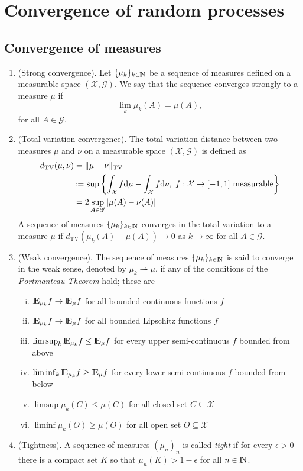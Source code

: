 \documentclass[a4paper,10pt]{scrbook}
\begin{document}
\section{Convergence of random processes}
\subsection{Convergence of measures}
\begin{enumerate}
 \item (Strong convergence). Let $\{\mu_k\}_{k\in\N}$ be a sequence of measures defined on a 
       measurable space $(\mathcal{X}, \mathscr{G})$. We say that the sequence converges strongly
       to a measure $\mu$ if
       \[
        \lim_k \mu_k(A) = \mu(A),
       \]
      for all $A\in\mathscr{G}$.
 \item (Total variation convergence). The total variation distance between two measures $\mu$ and 
       $\nu$ on a measurable space $(\mathcal{X}, \mathscr{G})$ is defined as
       \begin{align*}
        d_{\mathrm{TV}}(\mu,\nu) &= \|\mu-\nu\|_{\mathrm{TV}} \\
          &{}\mathop{\mathrel{:}=}{} \sup \left\{\int_{\mathcal{X}}f\mathrm{d}\mu - \int_{\mathcal{X}}f \mathrm{d} \nu,\ f:\mathcal{X}\to[-1,1] \text{ measurable} \right\}\\
          &=2\sup_{A\in\mathscr{G}}|\mu(A) - \nu(A)|
       \end{align*}
      A sequence of measures $\{\mu_k\}_{k\in\N}$ converges in the total variation
      to a measure $\mu$ if $d_{\mathrm{TV}}(\mu_k(A)-\mu(A))\to 0$ as $k\to\infty$
      for all $A\in\mathscr{G}$.
 \item (Weak convergence). The sequence of measures $\{\mu_k\}_{k\in\N}$ is said to converge 
       in the weak sense, denoted by $\mu_k \rightharpoonup \mu$, if any of the conditions 
       of the \textit{Portmanteau Theorem} hold; these are
       \begin{enumerate}[i.]
        \item $\E_{\mu_k} f\to \E_{\mu} f$ for all bounded continuous functions $f$
        \item $\E_{\mu_k} f\to \E_{\mu} f$ for all bounded Lipschitz functions $f$
        \item $\limsup_k\E_{\mu_k} f \leq \E_{\mu} f$ for every upper semi-continuous $f$ bounded from above
        \item $\liminf_k\E_{\mu_k} f \geq \E_{\mu} f$ for every lower semi-continuous $f$ bounded from below
        \item $\limsup \mu_k(C) \leq \mu(C)$ for all closed set $C\subseteq \mathcal{X}$
        \item $\liminf \mu_k(O) \geq \mu(O)$ for all open set $O\subseteq \mathcal{X}$
       \end{enumerate}
 \item (Tightness). A sequence of measures $(\mu_n)_n$ is called \textit{tight} if for every $\epsilon>0$
       there is a compact set $K$ so that $\mu_n(K)>1-\epsilon$ for all $n\in\N$.
       

\end{enumerate}
\end{document}
